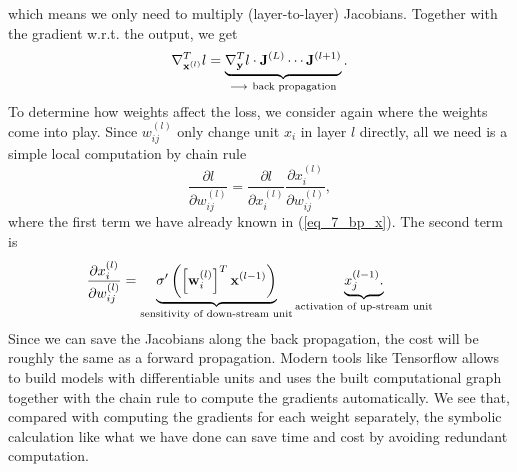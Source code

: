 \documentclass[../book-template.tex]{subfiles}
\begin{document}
which means we only need to multiply (layer-to-layer) Jacobians. Together with the gradient w.r.t. the output, we get
\begin{equation}\label{eq_7_bp_x}
	\nabla_{{\bf x}^{(l)}}^Tl=	\underbrace{\nabla_{{\bf y}}^Tl\cdot {\bf J}^{(L)}\cdots {\bf J}^{(l+1)}}_{\longrightarrow\ \text{back propagation}}.
\end{equation}
To determine how weights affect the loss, we consider again where the weights come into play. Since $w_{ij}^{(l)}$ only change unit ${x}_i$ in layer $l$ directly, all we need is a simple local computation by chain rule
\begin{equation*}
	\frac{\partial l}{\partial w_{ij}^{(l)}}=\frac{\partial l}{\partial x_i^{(l)}}\frac{\partial x_i^{(l)}}{\partial w_{ij}^{(l)}},
\end{equation*}
where the first term we have already known in (\ref{eq_7_bp_x}). The second term is
\begin{equation*}
	\frac{\partial x_i^{(l)}}{\partial w_{ij}^{(l)}} = \underbrace{\sigma'\left(\left[{\bf w}_i^{(l)}\right]^T{\bf x}^{(l-1)}\right)}_{\text{sensitivity of down-stream unit}}\underbrace{x_j^{(l-1)}.}_{\text{activation of up-stream unit}}
\end{equation*}
Since we can save the Jacobians along the back propagation, the cost will be roughly the same as a forward propagation. Modern tools like Tensorflow allows to build models with differentiable units and uses the built computational graph together with the chain rule to compute the gradients automatically. We see that, compared with computing the gradients for each weight separately, the symbolic calculation like what we have done can save time and cost by avoiding redundant computation.
\end{document}
